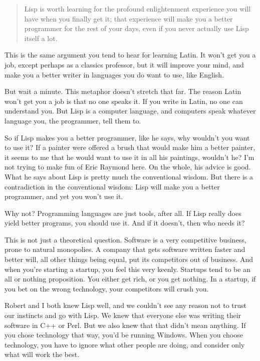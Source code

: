 \begin{quote}
Lisp is worth learning for the profound enlightenment experience you
will have when you finally get it; that experience will make you a
better programmer for the rest of your days, even if you never actually
use Lisp itself a lot.
\end{quote}

This is the same argument you tend to hear for learning Latin. It won't
get you a job, except perhaps as a classics professor, but it will
improve your mind, and make you a better writer in languages you do want
to use, like English.

But wait a minute. This metaphor doesn't stretch that far. The reason
Latin won't get you a job is that no one speaks it. If you write in
Latin, no one can understand you. But Lisp is a computer language, and
computers speak whatever language you, the programmer, tell them to.

So if Lisp makes you a better programmer, like he says, why wouldn't you
want to use it? If a painter were offered a brush that would make him a
better painter, it seems to me that he would want to use it in all his
paintings, wouldn't he? I'm not trying to make fun of Eric Raymond here.
On the whole, his advice is good. What he says about Lisp is pretty much
the conventional wisdom. But there is a contradiction in the
conventional wisdom: Lisp will make you a better programmer, and yet you
won't use it.

Why not? Programming languages are just tools, after all. If Lisp really
does yield better programs, you should use it. And if it doesn't, then
who needs it?

This is not just a theoretical question. Software is a very competitive
business, prone to natural monopolies. A company that gets software
written faster and better will, all other things being equal, put its
competitors out of business. And when you're starting a startup, you
feel this very keenly. Startups tend to be an all or nothing
proposition. You either get rich, or you get nothing. In a startup, if
you bet on the wrong technology, your competitors will crush you.

Robert and I both knew Lisp well, and we couldn't see any reason not to
trust our instincts and go with Lisp. We knew that everyone else was
writing their software in C++ or Perl. But we also knew that that didn't
mean anything. If you chose technology that way, you'd be running
Windows. When you choose technology, you have to ignore what other
people are doing, and consider only what will work the best.

